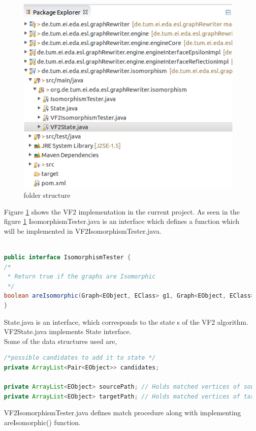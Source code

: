 \begin{figure}
\centerline{
\includegraphics[width=0.6\columnwidth]{figures/folder.png}
}
\caption{folder structure}
\label{folder}
\end{figure}

Figure \ref{folder} shows the VF2 implementation in the current project.
As seen in the figure \ref{folder}
IsomorphismTester.java is an interface which defines a function which will be implemented in VF2IsomorphismTester.java.
\\
\\

\begin{lstlisting}[language = Java,frame = single]
public interface IsomorphismTester {
/*
 * Return true if the graphs are Isomorphic
 */
boolean areIsomorphic(Graph<EObject, EClass> g1, Graph<EObject, EClass> g2);
}
\end{lstlisting}

State.java is an interface, which corresponds to the state s of the VF2 algorithm. VF2State.java implements State interface. 
\\

Some of the data structures used are,

\begin{lstlisting}[language = Java,frame = single]
/*possible candidates to add it to state */
private ArrayList<Pair<EObject>> candidates; 
	
private ArrayList<EObject> sourcePath; // Holds matched vertices of source
private ArrayList<EObject> targetPath; // Holds matched vertices of target

\end{lstlisting}

VF2IsomorphismTester.java defines match procedure along with implementing areIsomorphic() function. 


